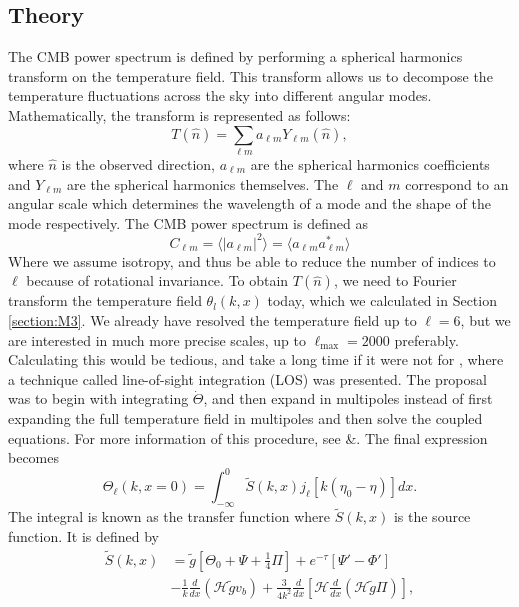 \documentclass{aa}
\begin{document}
\subsection{Theory}
The CMB power spectrum is defined by performing a spherical harmonics transform on the temperature field. This transform allows us to decompose the temperature fluctuations across the sky into different angular modes. Mathematically, the transform is represented as follows:
\begin{equation}
T(\hat{n}) = \sum_{\ell m}a_{\ell m}Y_{\ell m}(\hat{n}),
\end{equation}
where $\hat{n}$ is the observed direction,  $a_{\ell m}$ are the spherical harmonics coefficients and $Y_{\ell m}$ are the spherical harmonics themselves. The $\ell$ and $m$ correspond to an angular scale which determines the wavelength of a mode and the shape of the mode respectively. The CMB power spectrum is defined as
\begin{equation}
C_{\ell m} = \langle|a_{\ell m}|^2\rangle = \langle a_{\ell m}a^{*}_{\ell m}\rangle
\end{equation}
Where we assume isotropy, and thus be able to reduce the number of indices to $\ell$ because of rotational invariance. To obtain $T(\hat{n})$, we need to Fourier transform the temperature field $\theta_l(k, x)$ today, which we calculated in Section \ref{section:M3}. We already have resolved the temperature field up to $\ell = 6$, but we are interested in much more precise scales, up to $\ell_{\text{max}}=2000$ preferably. Calculating this would be tedious, and take a long time if it were not for \cite{4}, where a technique called line-of-sight integration (LOS) was presented. The proposal was to begin with integrating $\dot{\Theta}$, and then expand in multipoles instead of first expanding the full temperature field in multipoles and then solve the coupled equations. For more information of this procedure, see \cite{4}\&\cite{5}. The final expression becomes 
\begin{equation}
\Theta_\ell(k, x=0) = \int_{-\infty}^{0}\tilde{S}(k, x)j_\ell\left[k(\eta_0 - \eta)\right]dx.
\end{equation}
The integral is known as the transfer function where $\tilde{S}(k, x)$ is the source function. It is defined by
\begin{equation}
\begin{aligned}
\tilde{S}(k, x) &= \tilde{g}\left[\Theta_0 + \Psi + \frac{1}{4}\Pi\right] + e^{-\tau}\left[\Psi' - \Phi'\right] \\
&- \frac{1}{k}\frac{d}{dx}\left(\mathcal{H}\tilde{g}v_b\right) + \frac{3}{4k^2}\frac{d}{dx}\left[\mathcal{H}\frac{d}{dx}\left(\mathcal{H}\tilde{g}\Pi\right)\right],
\end{aligned}
\end{equation}
\end{document}
